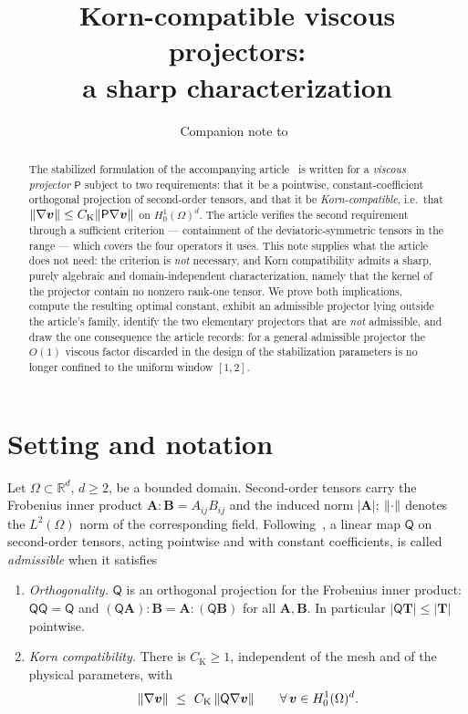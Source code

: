\documentclass[11pt]{article}
\title{Korn{-}compatible viscous projectors:\\ a sharp characterization}
\author{Companion note to~\cite{paper}}
\date{}
\theoremstyle{plain}
\theoremstyle{definition}
\theoremstyle{remark}
\newcommand{\ViscProj}{\mathsf{P}}
\newcommand{\AnyProj}{\mathsf{Q}}
\newcommand{\bv}{\boldsymbol{v}}
\newcommand{\CK}{C_{\mathrm{K}}}
\DeclarePairedDelimiter{\norm}{\lVert}{\rVert}
\begin{document}
\maketitle

\begin{abstract}
The stabilized formulation of the accompanying article~\cite{paper} is written for a
\emph{viscous projector} $\ViscProj$ subject to two requirements: that it be a pointwise,
constant{-}coefficient orthogonal projection of second{-}order tensors, and that it be
\emph{Korn{-}compatible}, i.e.\ that $\norm{\nabla\bv}\le\CK\norm{\ViscProj\nabla\bv}$ on
$H^1_0(\Omega)^d$. The article verifies the second requirement through a sufficient criterion
--- containment of the deviatoric{-}symmetric tensors in the range --- which covers the four
operators it uses. This note supplies what the article does not need: the criterion is
\emph{not} necessary, and Korn compatibility admits a sharp, purely algebraic and
domain{-}independent characterization, namely that the kernel of the projector contain no
nonzero rank{-}one tensor. We prove both implications, compute the resulting optimal constant,
exhibit an admissible projector lying outside the article's family, identify the two
elementary projectors that are \emph{not} admissible, and draw the one consequence the
article records: for a general admissible projector the $O(1)$ viscous factor discarded in the
design of the stabilization parameters is no longer confined to the uniform window $[1,2]$.
\end{abstract}

\section{Setting and notation}\label{sec:setting}

Let $\Omega\subset\mathbb{R}^d$, $d\ge2$, be a bounded domain. Second{-}order tensors carry the
Frobenius inner product $\mathbf{A}\!:\!\mathbf{B}=A_{ij}B_{ij}$ and the induced norm
$|\mathbf{A}|$; $\norm{\cdot}$ denotes the $L^2(\Omega)$ norm of the corresponding field.
Following~\cite{paper}, a linear map $\AnyProj$ on second{-}order tensors, acting pointwise and with
constant coefficients, is called \emph{admissible} when it satisfies

\begin{enumerate}[label=\textup{(V\arabic*)},ref=\textup{(V\arabic*)},leftmargin=3.4em]
  \item\label{V:orth} \emph{Orthogonality.} $\AnyProj$ is an orthogonal projection for the Frobenius
  inner product: $\AnyProj\AnyProj=\AnyProj$ and $(\AnyProj\mathbf{A})\!:\!\mathbf{B}=\mathbf{A}\!:\!(\AnyProj\mathbf{B})$
  for all $\mathbf{A},\mathbf{B}$. In particular $|\AnyProj\mathbf{T}|\le|\mathbf{T}|$ pointwise.
  \item\label{V:korn} \emph{Korn compatibility.} There is $\CK\ge1$, independent of the mesh and
  of the physical parameters, with
  \begin{equation}\label{eq:PiKorn}
    \norm{\nabla\bv}\ \le\ \CK\,\norm{\AnyProj\nabla\bv}
    \qquad\forall\,\bv\in H^1_0(\Omega)^d .
  \end{equation}
\end{enumerate}
\end{document}
